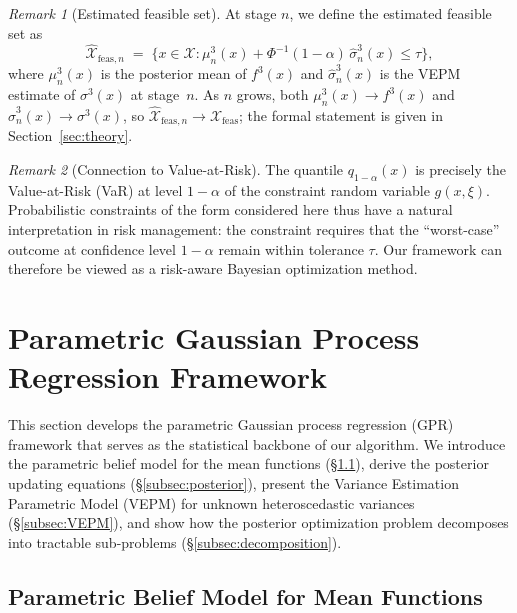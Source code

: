 \documentclass[12pt]{article}
\theoremstyle{plain}
\theoremstyle{definition}
\theoremstyle{remark}
\newtheorem{remark}{Remark}[section]
\newcommand{\cX}{\mathcal{X}}
\begin{document}
\begin{remark}[Estimated feasible set]\label{rem:estimated_feasible}
At stage $n$, we define the estimated feasible set as
\begin{equation}\label{eq:estimated_feasible}
  \hat{\cX}_{\mathrm{feas},n} \;=\; \bigl\{x\in\cX :
  \mu^3_n(x)+\Phi^{-1}(1-\alpha)\,\hat{\sigma}^3_n(x)\le\tau\bigr\},
\end{equation}
where $\mu^3_n(x)$ is the posterior mean of $f^3(x)$ and
$\hat{\sigma}^3_n(x)$ is the VEPM estimate of $\sigma^3(x)$ at
stage~$n$.  As $n$ grows, both $\mu^3_n(x)\to f^3(x)$ and
$\hat{\sigma}^3_n(x)\to\sigma^3(x)$, so
$\hat{\cX}_{\mathrm{feas},n}\to\cX_{\mathrm{feas}}$; the formal
statement is given in Section~\ref{sec:theory}.
\end{remark}

\begin{remark}[Connection to Value-at-Risk]\label{rem:var}
The quantile $q_{1-\alpha}(x)$ is precisely the Value-at-Risk
(\textup{VaR}) at level $1-\alpha$ of the constraint random variable
$g(x,\xi)$.  Probabilistic constraints of the form considered here
thus have a natural interpretation in risk management: the constraint
requires that the ``worst-case'' outcome at confidence level
$1-\alpha$ remain within tolerance $\tau$.  Our framework can
therefore be viewed as a risk-aware Bayesian optimization method.
\end{remark}

\section{Parametric Gaussian Process Regression Framework}\label{sec:GPR}

This section develops the parametric Gaussian process regression (GPR) framework that serves as the statistical backbone of our algorithm. We introduce the parametric belief model for the mean functions (\S\ref{subsec:belief}), derive the posterior updating equations (\S\ref{subsec:posterior}), present the Variance Estimation Parametric Model (VEPM) for unknown heteroscedastic variances (\S\ref{subsec:VEPM}), and show how the posterior optimization problem decomposes into tractable sub-problems (\S\ref{subsec:decomposition}).

\subsection{Parametric Belief Model for Mean Functions}\label{subsec:belief}
\end{document}
